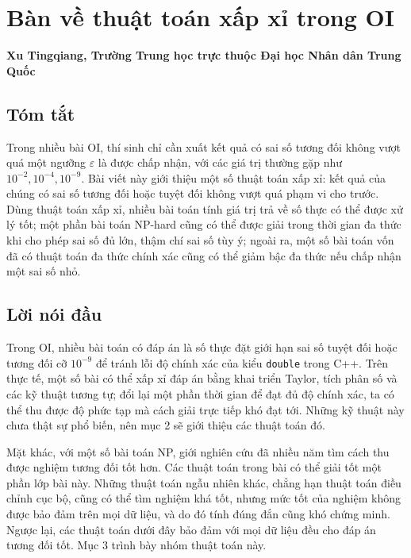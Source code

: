 \documentclass[11pt]{article}
\begin{document}
\section{Bàn về thuật toán xấp xỉ trong OI}

\begin{center}
\textbf{Xu Tingqiang, Trường Trung học trực thuộc Đại học Nhân dân Trung Quốc}
\end{center}

\subsection*{Tóm tắt}

Trong nhiều bài OI, thí sinh chỉ cần xuất kết quả có sai số tương đối không
vượt quá một ngưỡng $\varepsilon$ là được chấp nhận, với các giá trị thường gặp
như $10^{-2},10^{-4},10^{-9}$. Bài viết này giới thiệu một số thuật toán xấp
xỉ: kết quả của chúng có sai số tương đối hoặc tuyệt đối không vượt quá phạm vi
cho trước. Dùng thuật toán xấp xỉ, nhiều bài toán tính giá trị trả về số thực
có thể được xử lý tốt; một phần bài toán NP-hard cũng có thể được giải trong
thời gian đa thức khi cho phép sai số đủ lớn, thậm chí sai số tùy ý; ngoài ra,
một số bài toán vốn đã có thuật toán đa thức chính xác cũng có thể giảm bậc đa
thức nếu chấp nhận một sai số nhỏ.

\subsection{Lời nói đầu}

Trong OI, nhiều bài toán có đáp án là số thực đặt giới hạn sai số tuyệt đối
hoặc tương đối cỡ $10^{-9}$ để tránh lỗi độ chính xác của kiểu \texttt{double}
trong C++. Trên thực tế, một số bài có thể xấp xỉ đáp án bằng khai triển
Taylor, tích phân số và các kỹ thuật tương tự; đổi lại một phần thời gian để
đạt đủ độ chính xác, ta có thể thu được độ phức tạp mà cách giải trực tiếp khó
đạt tới. Những kỹ thuật này chưa thật sự phổ biến, nên mục 2 sẽ giới thiệu các
thuật toán đó.

Mặt khác, với một số bài toán NP, giới nghiên cứu đã nhiều năm tìm cách thu
được nghiệm tương đối tốt hơn. Các thuật toán trong bài có thể giải tốt một
phần lớp bài này. Những thuật toán ngẫu nhiên khác, chẳng hạn thuật toán điều
chỉnh cục bộ, cũng có thể tìm nghiệm khá tốt, nhưng mức tốt của nghiệm không
được bảo đảm trên mọi dữ liệu, và do đó tính đúng đắn cũng khó chứng minh.
Ngược lại, các thuật toán dưới đây bảo đảm với mọi dữ liệu đều cho đáp án
tương đối tốt. Mục 3 trình bày nhóm thuật toán này.
\end{document}
